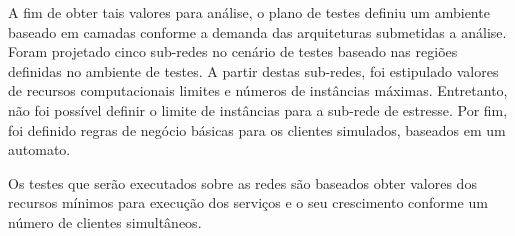 A fim de obter tais valores para análise, o plano de testes definiu um ambiente baseado em camadas conforme a demanda das arquiteturas submetidas a análise.
%
Foram projetado cinco sub-redes no cenário de testes baseado nas regiões definidas no ambiente de testes.
%
A partir destas sub-redes, foi estipulado valores de recursos computacionais limites e números de instâncias máximas.
%
Entretanto, não foi possível definir o limite de instâncias para a sub-rede de estresse.
%
Por fim, foi definido regras de negócio básicas para os clientes simulados, baseados em um automato.

Os testes que serão executados sobre as redes são baseados obter valores dos recursos mínimos para execução dos serviços e o seu crescimento conforme um número de clientes simultâneos. %
